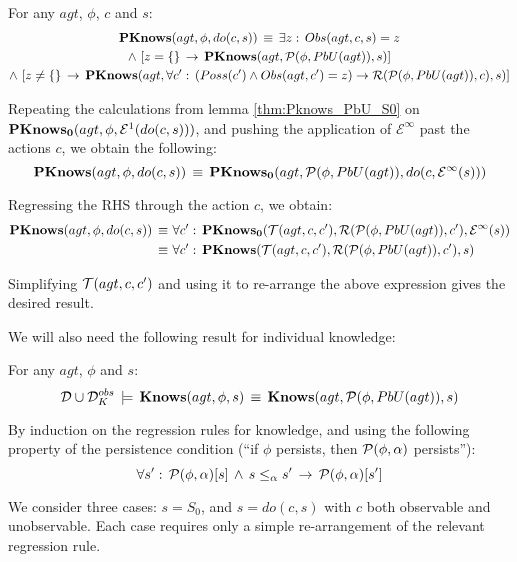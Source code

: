 \begin{thm}
\label{thm:Pknows_PbU_do}For any $agt$, $\phi$, $c$ and $s$:\begin{multline*}
\mathbf{PKnows}(agt,\phi,do(c,s))\,\equiv\,\exists z:\, Obs(agt,c,s)=z\\
\wedge\,\left[z=\{\}\,\rightarrow\,\mathbf{PKnows}(agt,\mathcal{P}(\phi,PbU(agt)),s)\right]\\
\wedge\,\left[z\neq\{\}\,\rightarrow\,\mathbf{PKnows}(agt,\forall c':\,\left(Poss(c')\wedge Obs(agt,c')=z\right)\rightarrow\mathcal{R}(\mathcal{P}(\phi,PbU(agt)),c),s)\right]\end{multline*}

\end{thm}
\begin{proofsketch}
Repeating the calculations from lemma \ref{thm:Pknows_PbU_S0} on
$\mathbf{PKnows_{0}}(agt,\phi,\mathcal{E}^{1}(do(c,s)))$, and pushing the application
of $\mathcal{E}^{\infty}$ past the actions $c$, we obtain the following:\[
\mathbf{PKnows}(agt,\phi,do(c,s))\,\equiv\,\mathbf{PKnows_{0}}(agt,\mathcal{P}(\phi,PbU(agt)),do(c,\mathcal{E}^{\infty}(s)))\]


Regressing the RHS through the action $c$, we obtain:\begin{align*}
\mathbf{PKnows}(agt,\phi,do(c,s))\,\equiv\,\, & \forall c':\,\mathbf{PKnows_{0}}(\mathcal{T}(agt,c,c'),\mathcal{R}(\mathcal{P}(\phi,PbU(agt)),c'),\mathcal{E}^{\infty}(s))\\
\equiv\,\, & \forall c':\,\mathbf{PKnows}(\mathcal{T}(agt,c,c'),\mathcal{R}(\mathcal{P}(\phi,PbU(agt)),c'),s)\end{align*}


Simplifying $\mathcal{T}(agt,c,c')$ and using it to re-arrange the above
expression gives the desired result.
\end{proofsketch}
We will also need the following result for individual knowledge:

\begin{thm}
\label{thm:Knows_impl_KnowsPbU}For any $agt$, $\phi$ and $s$:\[
\mathcal{D}\cup\mathcal{D}_{K}^{obs}\,\models\,\mathbf{Knows}(agt,\phi,s)\,\equiv\,\mathbf{Knows}(agt,\mathcal{P}(\phi,PbU(agt)),s)\]

\end{thm}
\begin{proofsketch}
By induction on the regression rules for knowledge, and using the
following property of the persistence condition ({}``if $\phi$ persists,
then $\mathcal{P}(\phi,\alpha)$ persists''):\[
\forall s':\,\mathcal{P}(\phi,\alpha)[s]\,\wedge\, s\leq_{\alpha}s'\,\rightarrow\,\mathcal{P}(\phi,\alpha)[s']\]


We consider three cases: $s=S_{0}$, and $s=do(c,s)$ with $c$ both
observable and unobservable. Each case requires only a simple re-arrangement
of the relevant regression rule.
\end{proofsketch}
\medskip{}


